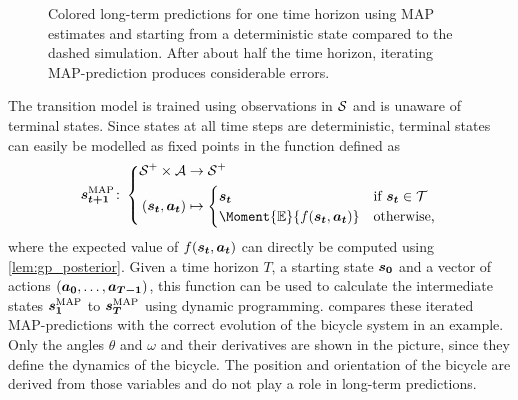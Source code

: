 \begin{figure}[t]
    \centering
    \caption[MAP long-term predictions]{
        Colored long-term predictions for one time horizon using MAP estimates and starting from a deterministic state compared to the dashed simulation.
        After about half the time horizon, iterating MAP-prediction produces considerable errors.
    }
    \label{fig:map_predictions}
\end{figure}
The transition model is trained using observations in $\mathcal{S}$ and is unaware of terminal states.
Since states at all time steps are deterministic, terminal states can easily be modelled as fixed points in the function defined as
\begin{align}
    \map{\mat{s_{t+1}}} \colon \left\{
        \begin{aligned}
            \Es^+ \times \Ah &\to \Es^+ \\
            (\mat{s_t}, \mat{a_t}) &\mapsto \begin{cases}
            \mat{s_t} & \text{if $\mat{s_t} \in \Tee$} \\
            \Moment{\E}{f(\mat{s_t}, \mat{a_t})} & \text{otherwise,}
        \end{cases}
    \end{aligned}
    \right.
\end{align}
where the expected value of $f(\bm{s_t}, \bm{a_t})$ can directly be computed using \cref{lem:gp_posterior}.
Given a time horizon $T$, a starting state $\bm{s_0}$ and a vector of actions $(\bm{a_0}, \dots, \bm{a_{T-1}})$, this function can be used to calculate the intermediate states $\bm{s_1}^{\text{MAP}}$ to $\bm{s_T}^{\text{MAP}}$ using dynamic programming.
 compares these iterated MAP-predictions with the correct evolution of the bicycle system in an example.
Only the angles $\theta$ and $\omega$ and their derivatives are shown in the picture, since they define the dynamics of the bicycle.
The position and orientation of the bicycle are derived from those variables and do not play a role in long-term predictions.

